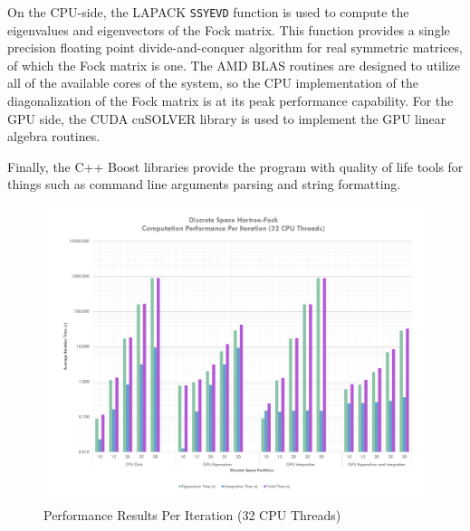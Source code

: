 \documentclass[conference, twoside]{IEEEtran}
\begin{document}
On the CPU-side, the LAPACK \texttt{SSYEVD} function is used to compute the eigenvalues and eigenvectors of the Fock matrix. This function provides a single precision floating point divide-and-conquer algorithm for real symmetric matrices, of which the Fock matrix is one. The AMD BLAS routines are designed to utilize all of the available cores of the system, so the CPU implementation of the diagonalization of the Fock matrix is at its peak performance capability. For the GPU side, the CUDA cuSOLVER library is used to implement the GPU linear algebra routines.

Finally, the C++ Boost libraries provide the program with quality of life tools for things such as command line arguments parsing and string formatting.

\begin{figure}[ht] %
\centering
\includegraphics[width=7in]{figures/thirtytwo-thread-results.pdf}
\caption{Performance Results Per Iteration (32 CPU Threads)}
\label{perf-results-per-iteration-thirtytwo-thread}
\end{figure}
\end{document}
